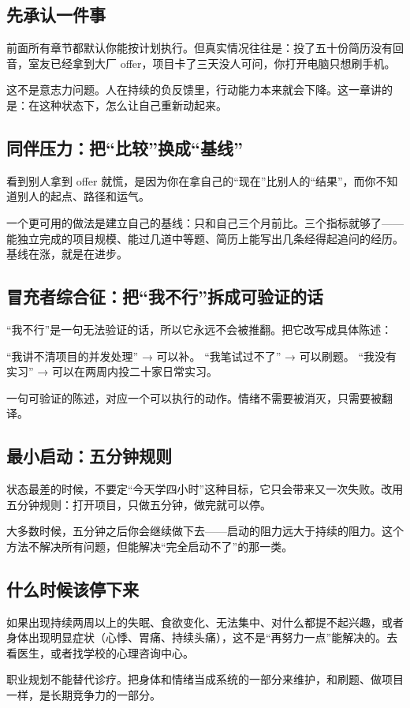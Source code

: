 \documentclass[UTF8,zihao=5,openany]{ctexbook}
\begin{document}
\subsection{先承认一件事}
前面所有章节都默认你能按计划执行。但真实情况往往是：投了五十份简历没有回音，室友已经拿到大厂 offer，项目卡了三天没人可问，你打开电脑只想刷手机。

这不是意志力问题。人在持续的负反馈里，行动能力本来就会下降。这一章讲的是：在这种状态下，怎么让自己重新动起来。

\subsection{同伴压力：把“比较”换成“基线”}
看到别人拿到 offer 就慌，是因为你在拿自己的“现在”比别人的“结果”，而你不知道别人的起点、路径和运气。

一个更可用的做法是建立自己的基线：只和自己三个月前比。三个指标就够了——能独立完成的项目规模、能过几道中等题、简历上能写出几条经得起追问的经历。基线在涨，就是在进步。

\subsection{冒充者综合征：把“我不行”拆成可验证的话}
“我不行”是一句无法验证的话，所以它永远不会被推翻。把它改写成具体陈述：

“我讲不清项目的并发处理” → 可以补。
“我笔试过不了” → 可以刷题。
“我没有实习” → 可以在两周内投二十家日常实习。

一句可验证的陈述，对应一个可以执行的动作。情绪不需要被消灭，只需要被翻译。

\subsection{最小启动：五分钟规则}
状态最差的时候，不要定“今天学四小时”这种目标，它只会带来又一次失败。改用五分钟规则：打开项目，只做五分钟，做完就可以停。

大多数时候，五分钟之后你会继续做下去——启动的阻力远大于持续的阻力。这个方法不解决所有问题，但能解决“完全启动不了”的那一类。

\subsection{什么时候该停下来}
如果出现持续两周以上的失眠、食欲变化、无法集中、对什么都提不起兴趣，或者身体出现明显症状（心悸、胃痛、持续头痛），这不是“再努力一点”能解决的。去看医生，或者找学校的心理咨询中心。

职业规划不能替代诊疗。把身体和情绪当成系统的一部分来维护，和刷题、做项目一样，是长期竞争力的一部分。
\end{document}
